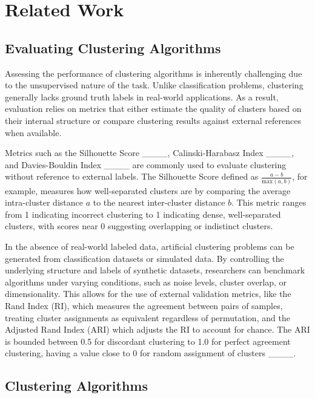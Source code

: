 \section{Related Work}
\label{related-work}




\subsection{Evaluating Clustering Algorithms}


Assessing the performance of clustering algorithms is inherently challenging due to the unsupervised nature of the task. Unlike classification problems, clustering generally lacks ground truth labels in real-world applications. As a result, evaluation relies on metrics that either estimate the quality of clusters based on their internal structure or compare clustering results against external references when available.

Metrics such as the Silhouette Score ____, Calinski-Harabasz Index ____, and Davies-Bouldin Index ____ are commonly used to evaluate clustering without reference to external labels. The Silhouette Score defined as $\frac{a-b}{\text{max}\left(a,b\right)}$, for example, measures how well-separated clusters are by comparing the average intra-cluster distance $a$ to the nearest inter-cluster distance $b$. This metric ranges from \text{-}1 indicating incorrect clustering to 1 indicating dense, well-separated clusters, with scores near 0 suggesting overlapping or indistinct clusters.

In the absence of real-world labeled data, artificial clustering problems can be generated from classification datasets or simulated data. By controlling the underlying structure and labels of synthetic datasets, researchers can benchmark algorithms under varying conditions, such as noise levels, cluster overlap, or dimensionality. This allows for the use of external validation metrics, like the Rand Index (RI), which measures the agreement between pairs of samples, treating cluster assignments as equivalent regardless of permutation, and the Adjusted Rand Index (ARI) which adjusts the RI to account for chance. The ARI is bounded between \text{-}0.5 for discordant clustering to 1.0 for perfect agreement clustering, having a value close to 0 for random assignment of clusters ____.


\subsection{Clustering Algorithms}


